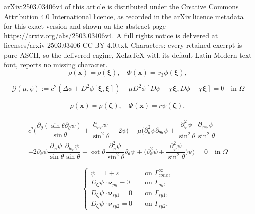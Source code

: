 \documentclass[10pt,a4paper]{amsart}
\begin{document}
arXiv:2503.03406v4 of this article is distributed under the Creative Commons Attribution 4.0 International licence, as recorded in the arXiv licence metadata for this exact version and shown on the abstract page https://arxiv.org/abs/2503.03406v4. A full rights notice is delivered at licenses/arxiv-2503.03406-CC-BY-4.0.txt. Characters: every retained excerpt is pure ASCII, so the delivered engine, XeLaTeX with its default Latin Modern text font, reports no missing character.
\begin{equation}\label{eq: conical tran.} 
	\rho(\bm{x})=\rho(\bm{\xi}), \quad \Phi(\bm{x})=x_3\phi(\bm{\xi}),
\end{equation}

\begin{equation}\label{eq: for Fmu}
	\mathcal{G}(\mu,\phi):=c^{2}(\Delta\phi+D^{2}\phi[\bm{\xi},\bm{\xi}])-\mu D^{2}\phi[D\phi-\chi\bm{\xi},D\phi-\chi\bm{\xi}]=0\quad\text{in $\Omega$}
\end{equation}

\begin{align}\label{eq: spherical tran.}
    \rho(\bm{x})=\rho(\bm{\zeta}), \quad \Phi(\bm{x})=r\psi(\bm{\zeta}),
\end{align}

\begin{multline}\label{eq: psi zhankai}
    c^{2}\big(\dfrac{\partial_{\theta}(\sin\theta\partial_{\theta}\psi)}{\sin\theta}+\dfrac{\partial_{\varphi\varphi} \psi}{\sin^2\theta}+2\psi\big)-\mu\Big(\partial^{2}_\theta\psi\partial_{\theta\theta}\psi+\dfrac{\partial^2_\varphi\psi}{\sin^2\theta}\dfrac{\partial_{\varphi\varphi} \psi}{\sin^2\theta}\\+2\partial_\theta \psi\dfrac{ \partial_\varphi\psi}{\sin\theta}\dfrac{\partial_{\theta\varphi}\psi}{\sin\theta}-\cot\theta\dfrac{\partial^2_\varphi\psi}{\sin^2\theta}\partial_\theta\psi+\big(\partial^{2}_\theta\psi+\dfrac{\partial^2_\varphi\psi}{\sin^2\theta}\big)\psi\Big)
    =0\quad\text{in $\Omega$}
\end{multline}

  \begin{equation}\label{eq:nianxing BC4}
		\begin{cases}
	        \psi=1+\varepsilon \quad&\text{on $\Gamma_{cone}^{\infty}$},\\ 
			D_{\bm{\zeta}}\psi\cdot\bm{\nu}_{py}=0\quad&\text{on $\Gamma_{py}$},\\
			D_{\bm{\zeta}}\psi\cdot\bm{\nu}_{sy1}=0\quad&\text{on $\Gamma_{sy1}$},\\
                D_{\bm{\zeta}}\psi\cdot\bm{\nu}_{sy2}=0\quad&\text{on $\Gamma_{sy2}$},	
		\end{cases}
	\end{equation}
\end{document}

